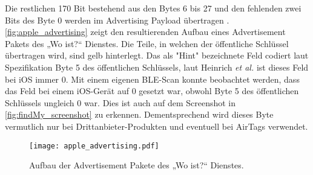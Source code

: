 Die restlichen 170 Bit bestehend aus den Bytes 6 bis 27 und den fehlenden zwei Bits des Byte 0 werden im Advertising Payload übertragen \cite{Apple_FindMySpec}.
\autoref{fig:apple_advertising} zeigt den resultierenden Aufbau eines Advertisement Pakets des „Wo ist?“ Dienstes.
Die Teile, in welchen der öffentliche Schlüssel übertragen wird, sind gelb hinterlegt.
Das als "Hint" bezeichnete Feld codiert laut Spezifikation \cite{Apple_FindMySpec} Byte 5 des öffentlichen Schlüssels, laut Heinrich \textit{et al.} \cite{Heinrich_FindMy} ist dieses Feld bei iOS immer 0.
Mit einem eigenen \ac{BLE}-Scan konnte beobachtet werden, dass das Feld bei einem iOS-Gerät auf 0 gesetzt war, obwohl Byte 5 des öffentlichen Schlüssels ungleich 0 war.
Dies ist auch auf dem Screenshot in \autoref{fig:findMy_screenshot} zu erkennen.
Dementsprechend wird dieses Byte vermutlich nur bei Drittanbieter-Produkten und eventuell bei AirTags verwendet.
\begin{figure}
    \centering
    \texttt{[image: apple\_advertising.pdf]}
    \caption{Aufbau der Advertisement Pakete des „Wo ist?“ Dienstes.}
    \label{fig:apple_advertising}
\end{figure}

